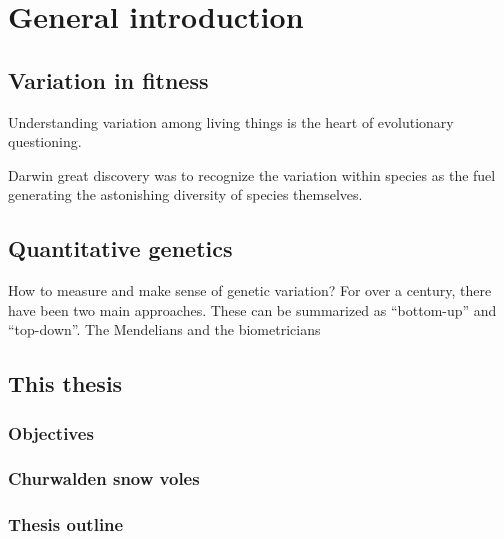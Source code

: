 
\chapter[Chapter 1: General introduction]{General introduction}

\section{Variation in fitness}
Understanding variation among living things is the heart of evolutionary questioning. 

Darwin great discovery was to recognize the variation within species as the fuel generating the astonishing diversity of species themselves.


\section{Quantitative genetics}

How to measure and make sense of genetic variation?
For over a century, there have been two main approaches. 
These can be summarized as ``bottom-up'' and ``top-down''.
The Mendelians and the biometricians

\section{This thesis}

\subsection{Objectives}

\subsection{Churwalden snow voles}

\subsection{Thesis outline}


